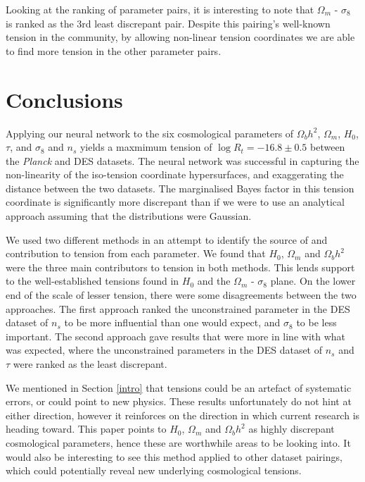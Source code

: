 \documentclass[%
 reprint,
 amsmath,amssymb,
 aps,
]{revtex4-2}
\begin{document}
Looking at the ranking of parameter pairs, it is interesting to note that $\Omega_m$ - $\sigma_8$ is ranked as the 3rd least discrepant pair. Despite this pairing's well-known tension in the community, by allowing non-linear tension coordinates we are able to find more tension in the other parameter pairs.


\section{Conclusions}

Applying our neural network to the six cosmological parameters of $\Omega_b h^2$, $\Omega_m$, $H_0$, $\tau$, and $\sigma_8$ and $n_s$ yields a maxmimum tension of $\log R_t = -16.8 \pm 0.5$ between the \textit{Planck} and DES datasets. The neural network was successful in capturing the non-linearity of the iso-tension coordinate hypersurfaces, and exaggerating the distance between the two datasets. The marginalised Bayes factor in this tension coordinate is significantly more discrepant than if we were to use an analytical approach assuming that the distributions were Gaussian.

We used two different methods in an attempt to identify the source of and contribution to tension from each parameter. We found that $H_0$, $\Omega_m$ and $\Omega_b h^2$ were the three main contributors to tension in both methods. This lends support to the well-established tensions found in $H_0$ and the $\Omega_m$ - $\sigma_8$ plane. On the lower end of the scale of lesser tension, there were some disagreements between the two approaches. The first approach ranked the unconstrained parameter in the DES dataset of $n_s$ to be more influential than one would expect, and $\sigma_8$ to be less important. The second approach gave results that were more in line with what was expected, where the unconstrained parameters in the DES dataset of $n_s$ and $\tau$ were ranked as the least discrepant.

We mentioned in Section \ref{intro} that tensions could be an artefact of systematic errors, or could point to new physics. These results unfortunately do not hint at either direction, however it reinforces on the direction in which current research is heading toward. This paper points to $H_0$, $\Omega_m$ and $\Omega_b h^2$ as highly discrepant cosmological parameters, hence these are worthwhile areas to be looking into. It would also be interesting to see this method applied to other dataset pairings, which could potentially reveal new underlying cosmological tensions.
\end{document}
